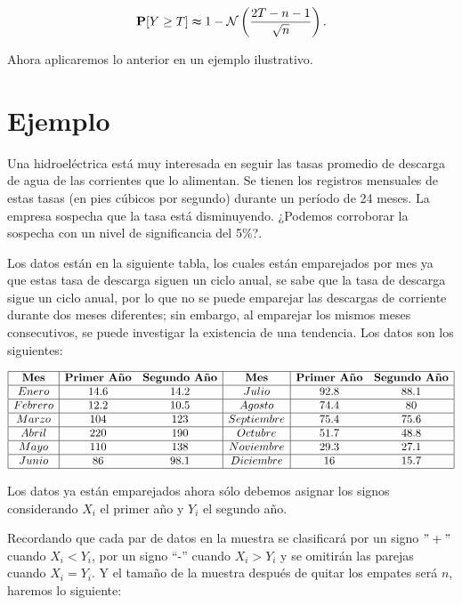\documentclass[
  a4paper,
  oneside,
  openany]{book}
\begin{document}
\[\mathbf{P}[Y\geq T] \thickapprox 1- \mathcal{N} \left(\frac{2T-n-1}{\sqrt{n}}\right).\]

Ahora aplicaremos lo anterior en un ejemplo ilustrativo.

\hypertarget{ejemplo-4}{%
\section{Ejemplo}\label{ejemplo-4}}

Una hidroeléctrica está muy interesada en seguir las tasas promedio de descarga de agua de las corrientes que lo alimentan. Se tienen los registros mensuales de estas tasas (en pies cúbicos por segundo) durante un período de 24 meses.
La empresa sospecha que la tasa está disminuyendo. ¿Podemos corroborar la sospecha con un nivel de significancia del 5\%?.

Los datos están en la siguiente tabla, los cuales están emparejados por mes ya que estas tasa de descarga siguen un ciclo anual, se sabe que la tasa de descarga sigue un ciclo anual, por lo que no se puede emparejar las descargas de corriente durante dos meses diferentes; sin embargo, al emparejar los mismos meses consecutivos, se puede investigar la existencia de una tendencia. Los datos son los siguientes:

\[
\begin{array}{|c| c c|c| c c|} 
\hline
\textbf{Mes} & \textbf{Primer Año} & \textbf{Segundo Año} & \textbf{Mes} & \textbf{Primer Año} & \textbf{Segundo Año}\\
\hline
Enero & 14.6 & 14.2 & Julio & 92.8 & 88.1 \\
\hline
Febrero&12.2&10.5&Agosto&74.4&80 \\
\hline
Marzo&104&123&Septiembre&75.4&75.6 \\
\hline
Abril&220&190&Octubre&51.7&48.8 \\
\hline
Mayo&110&138&Noviembre&29.3&27.1 \\
\hline
Junio&86&98.1&Diciembre&16&15.7 \\
\hline
\end{array}
\]

Los datos ya están emparejados ahora sólo debemos asignar los signos considerando \(X_i\) el primer año y \(Y_i\) el segundo año.

Recordando que cada par de datos en la muestra se clasificará por un signo \("+"\) cuando \(X_{i} < Y_{i}\), por un signo ``-'' cuando \(X_{i} > Y_{i}\) y se omitirán las parejas cuando \(X_i = Y_i\). Y el tamaño de la muestra después de quitar los empates será \(n\), haremos lo siguiente:
\end{document}
